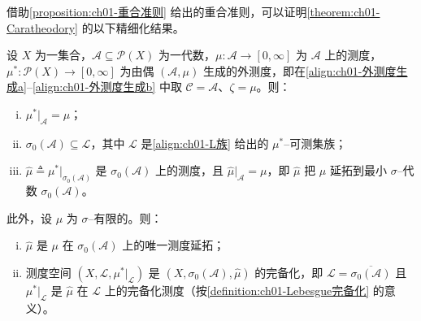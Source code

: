 \documentclass[../../main.tex]{subfiles}%
\begin{document}
借助\cref{proposition:ch01-重合准则} 给出的重合准则，可以证明\cref{theorem:ch01-Caratheodory} 的以下精细化结果。

\begin{theorem}\label{theorem:ch01-测度延拓}
设 $X$ 为一集合，$\mathcal{A}\subseteq\mathcal{P}(X)$ 为一代数，$\mu:\mathcal{A}\to[0,\infty]$ 为 $\mathcal{A}$ 上的测度，$\mu^*:\mathcal{P}(X)\to[0,\infty]$ 为由偶 $(\mathcal{A},\mu)$ 生成的外测度，即在\eqref{align:ch01-外测度生成a}--\eqref{align:ch01-外测度生成b} 中取 $\mathcal{C}=\mathcal{A}$、$\zeta=\mu$。则：
\begin{enumerate}[(i)]
\item $\mu^*|_{\mathcal{A}}=\mu$；
\item $\sigma_0(\mathcal{A})\subseteq\mathcal{L}$，其中 $\mathcal{L}$ 是\eqref{align:ch01-L族} 给出的 $\mu^*$--可测集族；
\item $\widehat{\mu}\triangleq\mu^*|_{\sigma_0(\mathcal{A})}$ 是 $\sigma_0(\mathcal{A})$ 上的测度，且 $\widehat{\mu}|_{\mathcal{A}}=\mu$，即 $\widehat{\mu}$ 把 $\mu$ 延拓到最小 $\sigma$--代数 $\sigma_0(\mathcal{A})$。
\end{enumerate}
此外，设 $\mu$ 为 $\sigma$--有限的。则：
\begin{enumerate}[(iv)]
\item $\widehat{\mu}$ 是 $\mu$ 在 $\sigma_0(\mathcal{A})$ 上的唯一测度延拓；
\item 测度空间 $(X,\mathcal{L},\mu^*|_{\mathcal{L}})$ 是 $(X,\sigma_0(\mathcal{A}),\widehat{\mu})$ 的完备化，即 $\mathcal{L}=\overline{\sigma_0(\mathcal{A})}$ 且 $\mu^*|_{\mathcal{L}}$ 是 $\widehat{\mu}$ 在 $\mathcal{L}$ 上的完备化测度（按\cref{definition:ch01-Lebesgue完备化} 的意义）。
\end{enumerate}
\end{theorem}
\end{document}
